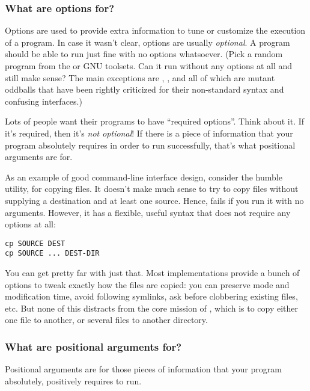 \subsubsection{What are options for?\label{optparse-what-options-for}}

Options are used to provide extra information to tune or customize the
execution of a program.  In case it wasn't clear, options are usually
\emph{optional}.  A program should be able to run just fine with no options
whatsoever.  (Pick a random program from the \UNIX{} or GNU toolsets.  Can
it run without any options at all and still make sense?  The main
exceptions are , , and all of which are mutant
oddballs that have been rightly criticized for their non-standard syntax
and confusing interfaces.)

Lots of people want their programs to have ``required options''.  Think
about it.  If it's required, then it's \emph{not optional}!  If there is a
piece of information that your program absolutely requires in order to
run successfully, that's what positional arguments are for.

As an example of good command-line interface design, consider the humble
 utility, for copying files.  It doesn't make much sense to try to
copy files without supplying a destination and at least one source.
Hence,  fails if you run it with no arguments.  However, it has a
flexible, useful syntax that does not require any options at all:
\begin{verbatim}
cp SOURCE DEST
cp SOURCE ... DEST-DIR
\end{verbatim}

You can get pretty far with just that.  Most  implementations
provide a bunch of options to tweak exactly how the files are copied:
you can preserve mode and modification time, avoid following symlinks,
ask before clobbering existing files, etc.  But none of this distracts
from the core mission of , which is to copy either one file to
another, or several files to another directory.


\subsubsection{What are positional arguments for?\label{optparse-what-positional-arguments-for}}

Positional arguments are for those pieces of information that your
program absolutely, positively requires to run.

